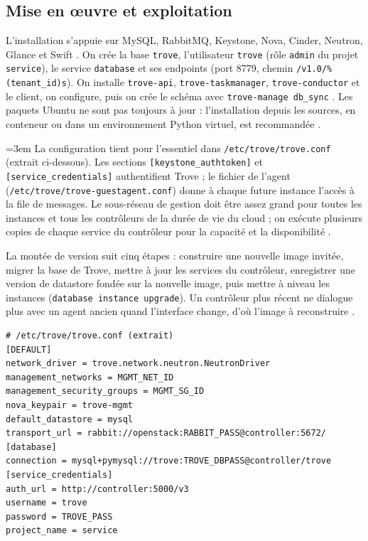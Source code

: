\subsection{Mise en œuvre et exploitation}\label{sec:tr-deploiement}

L'installation s'appuie sur MySQL, RabbitMQ, Keystone, Nova, Cinder, Neutron, Glance et Swift \parencite{trove-production}. On crée la base
\texttt{trove}, l'utilisateur \texttt{trove} (rôle \texttt{admin} du projet \texttt{service}), le service \texttt{database} et ses
endpoints (port 8779, chemin \texttt{/v1.0/\%(tenant\_\allowbreak id)s}). On installe \texttt{trove-api}, \texttt{trove-taskmanager},
\texttt{trove-conductor} et le client, on configure, puis on crée le schéma avec \texttt{trove-manage db\_sync}
\parencite{trove-install-ubuntu}. Les paquets Ubuntu ne sont pas toujours à jour : l'installation depuis les sources, en conteneur ou
dans un environnement Python virtuel, est recommandée \parencite{trove-install-ubuntu}.

{\emergencystretch=3em
La configuration tient pour l'essentiel dans \texttt{/etc/trove/trove.conf} (extrait ci-dessous). Les sections
\texttt{[keystone\_\allowbreak authtoken]} et \texttt{[service\_\allowbreak credentials]} authentifient Trove ; le fichier de l'agent
(\texttt{/etc/trove/trove-\allowbreak guestagent.conf}) donne à chaque future instance l'accès à la file de messages. Le sous-réseau de gestion
doit être assez grand pour toutes les instances et tous les contrôleurs de la durée de vie du cloud ; on exécute plusieurs copies
de chaque service du contrôleur pour la capacité et la disponibilité \parencite{trove-production,trove-install-ubuntu}.
\par}

La montée de version suit cinq étapes : construire une nouvelle image invitée, migrer la base de Trove, mettre à jour les services
du contrôleur, enregistrer une version de datastore fondée sur la nouvelle image, puis mettre à niveau les instances
(\texttt{database instance upgrade}). Un contrôleur plus récent ne dialogue plus avec un agent ancien quand l'interface change,
d'où l'image à reconstruire \parencite{trove-upgrade}.

\par\noindent\begin{minipage}{\linewidth}
\begin{lstlisting}
# /etc/trove/trove.conf (extrait)
[DEFAULT]
network_driver = trove.network.neutron.NeutronDriver
management_networks = MGMT_NET_ID
management_security_groups = MGMT_SG_ID
nova_keypair = trove-mgmt
default_datastore = mysql
transport_url = rabbit://openstack:RABBIT_PASS@controller:5672/
[database]
connection = mysql+pymysql://trove:TROVE_DBPASS@controller/trove
[service_credentials]
auth_url = http://controller:5000/v3
username = trove
password = TROVE_PASS
project_name = service
\end{lstlisting}
\end{minipage}\par

